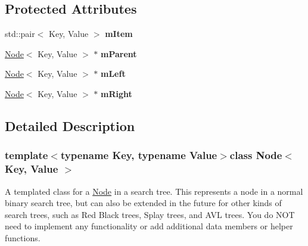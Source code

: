 \subsection*{Protected Attributes}
\begin{DoxyCompactItemize}
\item 
\hypertarget{classNode_a1f60ff1e9aa3e67b36fae39e73bd3ad0}{std\-::pair$<$ Key, Value $>$ {\bfseries m\-Item}}\label{classNode_a1f60ff1e9aa3e67b36fae39e73bd3ad0}

\item 
\hypertarget{classNode_a0edda9f5ea45078bef125a1298de9bef}{\hyperlink{classNode}{Node}$<$ Key, Value $>$ $\ast$ {\bfseries m\-Parent}}\label{classNode_a0edda9f5ea45078bef125a1298de9bef}

\item 
\hypertarget{classNode_a93b44cfd9f890e4ac24b84bb4c06b68d}{\hyperlink{classNode}{Node}$<$ Key, Value $>$ $\ast$ {\bfseries m\-Left}}\label{classNode_a93b44cfd9f890e4ac24b84bb4c06b68d}

\item 
\hypertarget{classNode_a3698d0c83982838834bc2218b15d7013}{\hyperlink{classNode}{Node}$<$ Key, Value $>$ $\ast$ {\bfseries m\-Right}}\label{classNode_a3698d0c83982838834bc2218b15d7013}

\end{DoxyCompactItemize}


\subsection{Detailed Description}
\subsubsection*{template$<$typename Key, typename Value$>$class Node$<$ Key, Value $>$}

A templated class for a \hyperlink{classNode}{Node} in a search tree. This represents a node in a normal binary search tree, but can also be extended in the future for other kinds of search trees, such as Red Black trees, Splay trees, and A\-V\-L trees. You do N\-O\-T need to implement any functionality or add additional data members or helper functions. 

